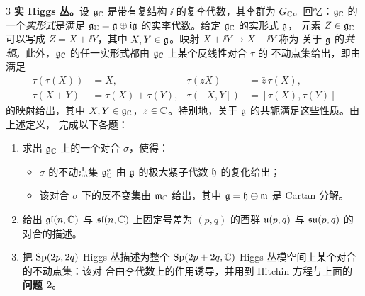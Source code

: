\begin{prob}{3}
\textbf{实 Higgs 丛。}设 $\mathfrak{g}_{\mathbb{C}}$ 是带有复结构 $\ii$ 的复李代数，其李群为 $G_{\mathbb{C}}$。回忆：$\mathfrak{g}_{\mathbb{C}}$
的一个\emph{实形式}是满足 $\mathfrak{g}_{\mathbb{C}}=\mathfrak{g}\oplus\mathrm{i}\mathfrak{g}$ 的实李代数。给定 $\mathfrak{g}_{\mathbb{C}}$ 的实形式 $\mathfrak{g}$，
元素 $Z\in\mathfrak{g}_{\mathbb{C}}$ 可以写成 $Z=X+\ii Y$，其中 $X,Y\in\mathfrak{g}$。映射 $X+\ii Y\mapsto X-\ii Y$ 称为
关于 $\mathfrak{g}$ 的\emph{共轭}。此外，$\mathfrak{g}_{\mathbb{C}}$ 的任一实形式都由 $\mathfrak{g}_{\mathbb{C}}$ 上某个反线性对合 $\tau$ 的
不动点集给出，即由满足
\[
\begin{aligned}
\tau(\tau(X))&=X, & \tau(zX)&=\bar z\,\tau(X),\\
\tau(X+Y)&=\tau(X)+\tau(Y), & \tau([X,Y])&=[\tau(X),\tau(Y)]
\end{aligned}
\]
的映射给出，其中 $X,Y\in\mathfrak{g}_{\mathbb{C}}$，$z\in\mathbb{C}$。特别地，关于 $\mathfrak{g}$ 的共轭满足这些性质。由上述定义，
完成以下各题：
\begin{enumerate}[label=(\roman*),leftmargin=2.2em]
\item 求出 $\mathfrak{g}_{\mathbb{C}}$ 上的一个对合 $\sigma$，使得：
  \begin{itemize}[label=--,leftmargin=2.6em]
  \item $\sigma$ 的不动点集 $\mathfrak{g}^{\sigma}_{\mathbb{C}}$ 由 $\mathfrak{g}$ 的极大紧子代数 $\mathfrak{h}$ 的复化给出；
  \item 该对合 $\sigma$ 下的反不变集由 $\mathfrak{m}_{\mathbb{C}}$ 给出，其中 $\mathfrak{g}=\mathfrak{h}\oplus\mathfrak{m}$ 是 Cartan 分解。
  \end{itemize}
\item 给出 $\mathfrak{gl}(n,\mathbb{C})$ 与 $\mathfrak{sl}(n,\mathbb{C})$ 上固定号差为 $(p,q)$ 的酉群 $\mathfrak{u}(p,q)$ 与
  $\mathfrak{su}(p,q)$ 的对合的描述。
\item 把 $\mathrm{Sp}(2p,2q)$-Higgs 丛描述为整个 $\mathrm{Sp}(2p+2q,\mathbb{C})$-Higgs 丛模空间上某个对合的不动点集：该对
  合由李代数上的作用诱导，并用到 Hitchin 方程与上面的 \textbf{问题 2}。
\end{enumerate}
\end{prob}

